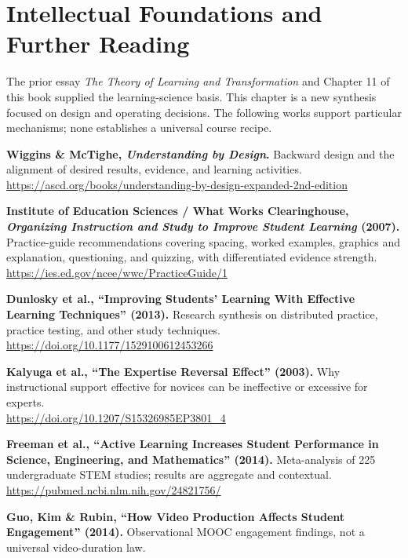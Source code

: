 \section*{Intellectual Foundations and Further Reading}

The prior essay \emph{The Theory of Learning and Transformation} and Chapter 11 of this book supplied the learning-science basis. This chapter is a new synthesis focused on design and operating decisions. The following works support particular mechanisms; none establishes a universal course recipe.

\begin{enumerate}[label={[\textbf{S\arabic*}]}, leftmargin=2em, itemsep=0.6em]
    \item \textbf{Wiggins \& McTighe, \emph{Understanding by Design}.} Backward design and the alignment of desired results, evidence, and learning activities. \\
    \url{https://ascd.org/books/understanding-by-design-expanded-2nd-edition}
    \item \textbf{Institute of Education Sciences / What Works Clearinghouse, \emph{Organizing Instruction and Study to Improve Student Learning} (2007).} Practice-guide recommendations covering spacing, worked examples, graphics and explanation, questioning, and quizzing, with differentiated evidence strength. \\
    \url{https://ies.ed.gov/ncee/wwc/PracticeGuide/1}
    \item \textbf{Dunlosky et al., ``Improving Students' Learning With Effective Learning Techniques'' (2013).} Research synthesis on distributed practice, practice testing, and other study techniques. \\
    \url{https://doi.org/10.1177/1529100612453266}
    \item \textbf{Kalyuga et al., ``The Expertise Reversal Effect'' (2003).} Why instructional support effective for novices can be ineffective or excessive for experts. \\
    \url{https://doi.org/10.1207/S15326985EP3801_4}
    \item \textbf{Freeman et al., ``Active Learning Increases Student Performance in Science, Engineering, and Mathematics'' (2014).} Meta-analysis of 225 undergraduate STEM studies; results are aggregate and contextual. \\
    \url{https://pubmed.ncbi.nlm.nih.gov/24821756/}
    \item \textbf{Guo, Kim \& Rubin, ``How Video Production Affects Student Engagement'' (2014).} Observational MOOC engagement findings, not a universal video-duration law. \\

\end{enumerate}
